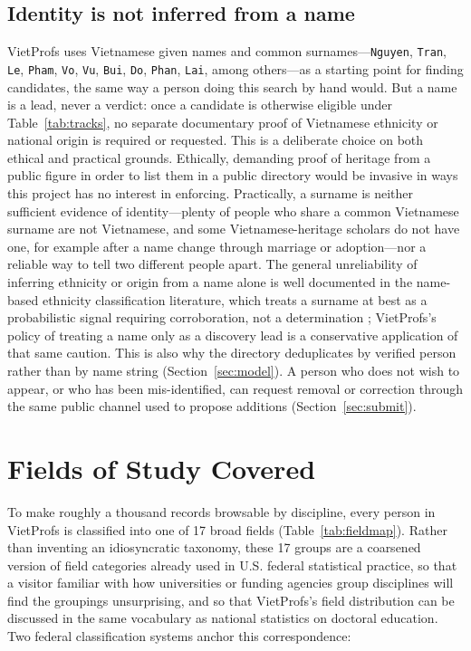\documentclass[11pt]{article}
\newcommand{\code}[1]{\texttt{\small #1}}
\begin{document}
\subsection{Identity is not inferred from a name}
VietProfs uses Vietnamese given names and common surnames---\code{Nguyen}, \code{Tran}, \code{Le}, \code{Pham}, \code{Vo}, \code{Vu}, \code{Bui}, \code{Do}, \code{Phan}, \code{Lai}, among others---as a starting point for finding candidates, the same way a person doing this search by hand would.
But a name is a lead, never a verdict: once a candidate is otherwise eligible under Table~\ref{tab:tracks}, no separate documentary proof of Vietnamese ethnicity or national origin is required or requested.
This is a deliberate choice on both ethical and practical grounds.
Ethically, demanding proof of heritage from a public figure in order to list them in a public directory would be invasive in ways this project has no interest in enforcing.
Practically, a surname is neither sufficient evidence of identity---plenty of people who share a common Vietnamese surname are not Vietnamese, and some Vietnamese-heritage scholars do not have one, for example after a name change through marriage or adoption---nor a reliable way to tell two different people apart.
The general unreliability of inferring ethnicity or origin from a name alone is well documented in the name-based ethnicity classification literature, which treats a surname at best as a probabilistic signal requiring corroboration, not a determination \cite{mateos2007name,ambekar2009name}; VietProfs's policy of treating a name only as a discovery lead is a conservative application of that same caution.
This is also why the directory deduplicates by verified person rather than by name string (Section~\ref{sec:model}).
A person who does not wish to appear, or who has been mis-identified, can request removal or correction through the same public channel used to propose additions (Section~\ref{sec:submit}).

\section{Fields of Study Covered}
\label{sec:fields}
To make roughly a thousand records browsable by discipline, every person in VietProfs is classified into one of 17 broad fields (Table~\ref{tab:fieldmap}).
Rather than inventing an idiosyncratic taxonomy, these 17 groups are a coarsened version of field categories already used in U.S. federal statistical practice, so that a visitor familiar with how universities or funding agencies group disciplines will find the groupings unsurprising, and so that VietProfs's field distribution can be discussed in the same vocabulary as national statistics on doctoral education.
Two federal classification systems anchor this correspondence:
\end{document}
